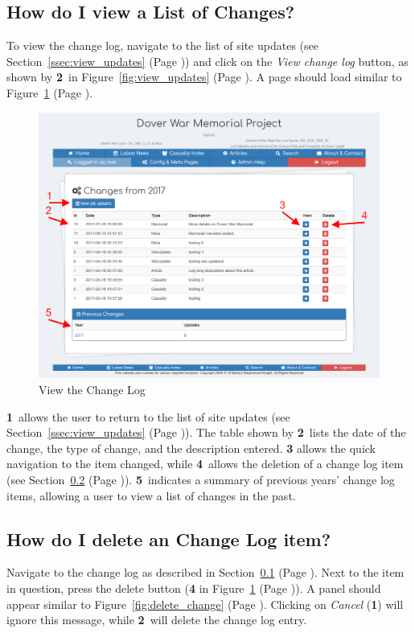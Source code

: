 \documentclass[12pt]{article}
\newcommand{\marker}[1]{\color{red}\textbf{#1}\color{black}}
\newcommand{\myref}[1]{\ref{#1} {\scriptsize(Page \pageref{#1})}}
\begin{document}
\newpage
\FloatBarrier
\subsection{How do I view a List of Changes?}\label{ssec:changeLog}
To view the change log, navigate to the list of site updates (see Section~\myref{ssec:view_updates}) and click on the \textit{View change log} button, as shown by \marker{2}\ in Figure~\myref{fig:view_updates}. A page should load similar to Figure~\myref{fig:view_changes}.

\begin{figure}[h]
  \centering
 \includegraphics[width=.9\textwidth]{pics/view_changes.png}
	\caption{View the Change Log}\label{fig:view_changes}
\end{figure}

\marker{1}\ allows the user to return to the list of site updates (see Section~\myref{ssec:view_updates}). The table shown by \marker{2}\ lists the date of the change, the type of change, and the description entered. \marker{3} allows the quick navigation to the item changed, while \marker{4}\ allows the deletion of a change log item (see Section~\myref{ssec:delete_change}). \marker{5}\ indicates a summary of previous years' change log items, allowing a user to view a list of changes in the past.

\newpage
\FloatBarrier
\subsection{How do I delete an Change Log item?}\label{ssec:delete_change}
Navigate to the change log as described in Section~\myref{ssec:changeLog}. Next to the item in question, press the delete button (\marker{4} in Figure~\myref{fig:view_changes}). A panel should appear similar to Figure~\myref{fig:delete_change}. Clicking on \textit{Cancel} (\marker{1}) will ignore this message, while \marker{2}\ will delete the change log entry.
\end{document}

